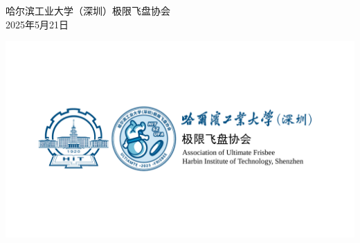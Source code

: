 \documentclass{ctexart}
\begin{document}
\begin{titlepage}
\begin{center}
        {哈尔滨工业大学（深圳）极限飞盘协会} \\[1em]
        {2025年5月21日}\par %

        \vspace{12em} %
        \includegraphics[width=0.65\paperwidth, trim=50bp 6.4cm 50bp 6.3cm, clip]{协会旗帜.pdf}
    \end{center}

    \vfill %
\end{titlepage}

\clearpage
{}
\pagestyle{plain}
\tableofcontents
\clearpage
{}
\pagestyle{fancy}
\end{document}
